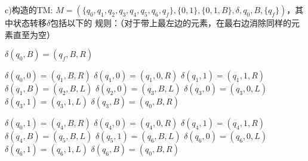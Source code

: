 \begin{solution} c)构造的TM:
    $M=(\{q_0,q_1,q_2,q_3,q_4,q_5,q_6,q_f\},\{0,1\},\{0,1,B\},\delta,q_0,B,\{q_f\})$，其中状态转移$\delta$包括以下的
    规则：（对于带上最左边的元素，在最右边消除同样的元素直至为空）

    $\delta(q_0,B) = (q_f,B,R)$

    $\delta(q_0,0) = (q_1,B,R)$
    $\delta(q_1,0) = (q_1,0,R)$
    $\delta(q_1,1) = (q_1,1,R)$
    $\delta(q_1,B) = (q_2,B,L)$
    $\delta(q_2,0) = (q_3,B,L)$
    $\delta(q_3,0) = (q_3,0,L)$
    $\delta(q_3,1) = (q_3,1,L)$
    $\delta(q_3,B) = (q_0,B,R)$

    $\delta(q_0,1) = (q_4,B,R)$
    $\delta(q_4,0) = (q_4,0,R)$
    $\delta(q_4,1) = (q_4,1,R)$
    $\delta(q_4,B) = (q_5,B,L)$
    $\delta(q_5,1) = (q_6,B,L)$
    $\delta(q_6,0) = (q_6,0,L)$
    $\delta(q_6,1) = (q_6,1,L)$
    $\delta(q_6,B) = (q_0,B,R)$
\end{solution}